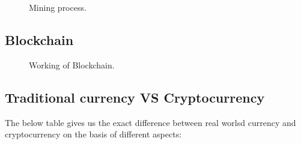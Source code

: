 \documentclass[9pt,twocolumn,twoside]{optica-suppl-materials}
\begin{document}
\begin{figure}[htbp]
\centering
{}
\caption{Mining process.}
\label{fig:false-color}
\end{figure}

\subsection{Blockchain}


\begin{figure}[htbp]
\centering
{}
\caption{Working of Blockchain.}
\label{fig:false-color}
\end{figure}



\subsection{Traditional currency VS Cryptocurrency}
The below table gives us the exact difference between real worlsd currency and cryptocurrency on the basis of different aspects:
\\
\bigskip
\bigskip
\bigskip
\bigskip
\bigskip
\end{document}
